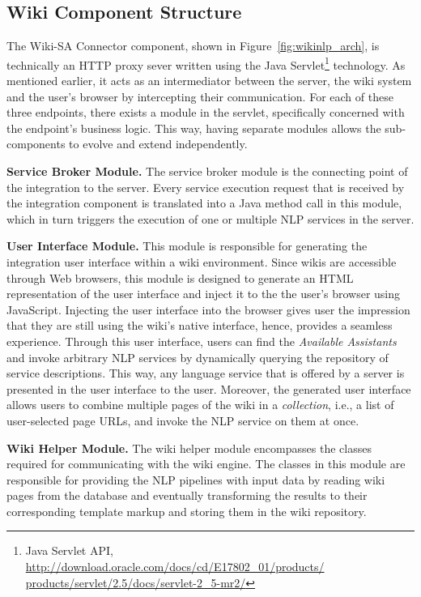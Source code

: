 \subsection{Wiki Component Structure}
The Wiki-SA Connector component, shown in Figure~\ref{fig:wikinlp_arch}, is technically an HTTP proxy sever written using the Java Servlet\footnote{Java Servlet API, \url{http://download.oracle.com/docs/cd/E17802_01/products/ products/servlet/2.5/docs/servlet-2_5-mr2/}} technology. As mentioned earlier, it acts as an intermediator between the \sa server, the wiki system and the user's browser by intercepting their communication. For each of these three endpoints, there exists a module in the servlet, specifically concerned with the endpoint's business logic. This way, having separate modules allows the sub-components to evolve and extend independently.

\blankline
\noindent
\textbf{Service Broker Module. }{The service broker module is the connecting point of the integration to the \sa server. Every service execution request that is received by the integration component is translated into a Java method call in this module, which in turn triggers the execution of one or multiple NLP services in the \sa server.}

\blankline
\noindent
\textbf{User Interface Module. }{This module is responsible for generating the integration user interface within a wiki environment. Since wikis are accessible through Web browsers, this module is designed to generate an HTML representation of the \sa user interface and inject it to the the user's browser using JavaScript. Injecting the user interface into the browser gives user the impression that they are still using the wiki's native interface, hence, provides a seamless experience. Through this user interface, users can find the \emph{Available Assistants} and invoke arbitrary NLP services by dynamically querying the \sa repository of service descriptions. This way, any language service that is offered by a \sa server is presented in the user interface to the user. Moreover, the generated user interface allows users to combine multiple pages of the wiki in a \emph{collection}, i.e., a list of user-selected page URLs, and invoke the NLP service on them at once.}

\blankline
\noindent
\textbf{Wiki Helper Module. }{The wiki helper module encompasses the classes required for communicating with the wiki engine. The classes in this module are responsible for providing the NLP pipelines with input data by reading wiki pages from the database and eventually transforming the results to their corresponding template markup and storing them in the wiki repository.}

